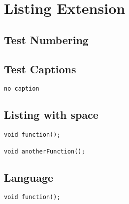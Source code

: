 
\chapter{\label{listing-extension}Listing Extension}
\section{\label{test-numbering}Test Numbering}
\section{\label{test-captions}Test Captions}
\begin{verbatim}no caption\end{verbatim}
\section{\label{listing-with-space}Listing with space}
\begin{verbatim}void function();

void anotherFunction();
\end{verbatim}
\section{\label{language}Language}
\begin{verbatim}void function();\end{verbatim}
